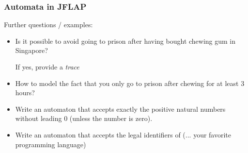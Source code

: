 \documentclass{beamer}
\begin{document}
\begin{frame}[fragile]\frametitle{Automata in JFLAP}

  Further questions / examples:

  \begin{itemize}
  \item Is it possible to avoid going to prison after having bought chewing gum in Singapore?

    If yes, provide a \emph{trace}
    
  \item How to model the fact that you only go to prison after chewing for at least 3 hours?

    
  \item Write an automaton that accepts exactly the positive natural numbers without leading 0 (unless the number is zero).
    
  \item Write an automaton that accepts the legal identifiers of (... your favorite programming language)
  \end{itemize}
  
\end{frame}
\end{document}
